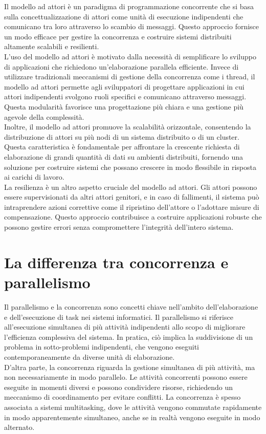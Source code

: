Il modello ad attori è un paradigma di programmazione concorrente che si basa sulla concettualizzazione di attori come unità di esecuzione indipendenti che comunicano tra loro attraverso lo scambio di messaggi. 
Questo approccio fornisce un modo efficace per gestire la concorrenza e costruire sistemi distribuiti altamente scalabili e resilienti. \\
L'uso del modello ad attori è motivato dalla necessità di semplificare lo sviluppo di applicazioni che richiedono un'elaborazione parallela efficiente. 
Invece di utilizzare tradizionali meccanismi di gestione della concorrenza come i thread, il modello ad attori permette agli sviluppatori di progettare applicazioni in cui attori indipendenti svolgono ruoli specifici e comunicano attraverso messaggi.
Questa modularità favorisce una progettazione più chiara e una gestione più agevole della complessità. \\
Inoltre, il modello ad attori promuove la scalabilità orizzontale, consentendo la distribuzione di attori su più nodi di un sistema distribuito o di un cluster.
Questa caratteristica è fondamentale per affrontare la crescente richiesta di elaborazione di grandi quantità di dati su ambienti distribuiti, fornendo una soluzione per costruire sistemi che possano crescere in modo flessibile in risposta ai carichi di lavoro. \\
La resilienza è un altro aspetto cruciale del modello ad attori.
Gli attori possono essere supervisionati da altri attori genitori, e in caso di fallimenti, il sistema può intraprendere azioni correttive come il ripristino dell'attore o l'adottare misure di compensazione.
Questo approccio contribuisce a costruire applicazioni robuste che possono gestire errori senza compromettere l'integrità dell'intero sistema.

\section[Concorrenza e parallelismo]{La differenza tra concorrenza e parallelismo}
Il parallelismo e la concorrenza sono concetti chiave nell'ambito dell'elaborazione e dell'esecuzione di task nei sistemi informatici.
Il parallelismo si riferisce all'esecuzione simultanea di più attività indipendenti allo scopo di migliorare l'efficienza complessiva del sistema.
In pratica, ciò implica la suddivisione di un problema in sotto-problemi indipendenti, che vengono eseguiti contemporaneamente da diverse unità di elaborazione. \\
D'altra parte, la concorrenza riguarda la gestione simultanea di più attività, ma non necessariamente in modo parallelo. 
Le attività concorrenti possono essere eseguite in momenti diversi e possono condividere risorse, richiedendo un meccanismo di coordinamento per evitare conflitti.
La concorrenza è spesso associata a sistemi multitasking, dove le attività vengono commutate rapidamente in modo apparentemente simultaneo, anche se in realtà vengono eseguite in modo alternato.

